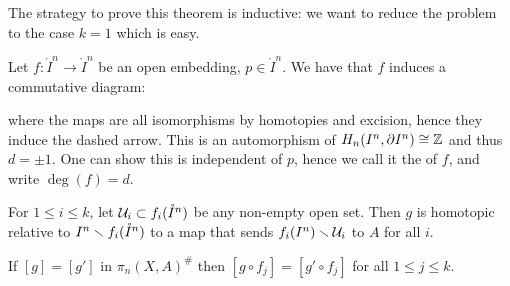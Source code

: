 \label{fig:HAT1}\medskip

The strategy to prove this theorem is inductive: we want to reduce the problem to the case $k=1$ which is easy.

\begin{definition}
Let $f:\ring I^n\to\ring I^n $ be an open embedding, $p\in\ring I^n$. We have that $f$ induces a commutative diagram:
\begin{center}
\end{center}
\end{definition}
where the maps are all isomorphisms by homotopies and excision, hence they induce the dashed arrow. This is an automorphism of $H_n(I^n,\partial I^n)\cong{\mathbb Z}$ and thus $d=\pm1$. One can show this is independent of $p$, hence we call it the  of $f$, and write $\deg(f)=d$.

\begin{lemma}
For $1\leq i\leq k$, let $\mathcal{U}_i\subset f_i(\mathring I^n)$ be any non-empty open set. Then $g$ is homotopic relative to $I^n\smallsetminus f_i(\mathring{I}^n)$ to a map that sends $f_i(I^n)\smallsetminus\mathcal{U}_i$ to $A$ for all $i$.
\end{lemma}

\begin{remark}
If $[g]=[g']$ in $\pi_n(X,A)^\#$ then $[g\circ f_j]=[g'\circ f_j]$ for all $1\leq j\leq k$.
\end{remark}

